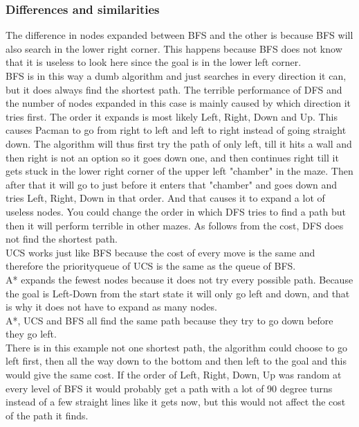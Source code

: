 \subsubsection{Differences and similarities}
The difference in nodes expanded between BFS and the other is because BFS will also search in the lower right corner. 
This happens because BFS does not know that it is useless to look here since the goal is in the lower left corner.\\
BFS is in this way a dumb algorithm and just searches in every direction it can, but it does always find the shortest path.
The terrible performance of DFS and the number of nodes expanded in this case is mainly caused by which direction it tries first. 
The order it expands is most likely Left, Right, Down and Up. This causes Pacman to go from right to left 
and left to right instead of going straight down. The algorithm will thus first try the path of only left, 
till it hits a wall and then right is not an option so it goes down one, and then continues right till it gets stuck in the lower 
right corner of the upper left "chamber" in the maze. Then after that it will go to just before it enters that "chamber" 
and goes down and tries Left, Right, Down in that order. And that causes it to expand a lot of useless nodes. You could change the 
order in which DFS tries to find a path but then it will perform terrible in other mazes. As follows from the cost, DFS does not 
find the shortest path.\\
UCS works just like BFS because the cost of every move is the same and therefore the priorityqueue of UCS is the same as the queue of BFS.\\
A* expands the fewest nodes because it does not try every possible path. Because the goal is Left-Down from the start state
it will only go left and down, and that is why it does not have to expand as many nodes.\\
A*, UCS and BFS all find the same path because they try to go down before they go left. \\
There is in this example not one shortest path, the algorithm could choose to go left first, then all the way down to the bottom
and then left to the goal and this would give the same cost. If the order of Left, Right, Down, Up was random at every level of BFS
it would probably get a path with a lot of 90 degree turns instead of a few straight lines like it gets now, 
but this would not affect the cost of the path it finds.

